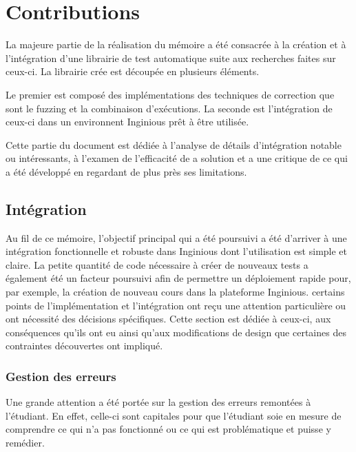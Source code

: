 \documentclass[a4paper]{report}
\begin{document}
\chapter{Contributions}
La majeure partie de la réalisation du mémoire a été consacrée à la création et à l'intégration d'une librairie de test automatique suite aux recherches faites sur ceux-ci.
La librairie crée est découpée en plusieurs éléments.

Le premier est composé des implémentations des techniques de correction que sont le fuzzing et la combinaison d'exécutions.
La seconde est l'intégration de ceux-ci dans un environnent Inginious prêt à être utilisée.

Cette partie du document est dédiée à l'analyse de détails d'intégration notable ou intéressants, à l'examen de l'efficacité de a solution et a une critique de ce qui a été développé en regardant de plus près ses limitations.



\section{Intégration}
Au fil de ce mémoire, l'objectif principal qui a été poursuivi a été d'arriver à une intégration fonctionnelle et robuste dans Inginious dont l'utilisation est simple et claire.
La petite quantité de code nécessaire à créer  de nouveaux tests a également été un facteur poursuivi afin de permettre un déploiement rapide pour, par exemple, la création de nouveau cours dans la plateforme Inginious.
certains points de l'implémentation et l'intégration ont reçu une attention particulière ou ont nécessité des décisions spécifiques.
Cette section est dédiée à ceux-ci, aux conséquences qu'ils ont eu ainsi qu'aux modifications de design que certaines des contraintes découvertes ont impliqué.

\subsection{Gestion des erreurs}
Une grande attention a été portée sur la gestion des erreurs remontées à l'étudiant.
En effet, celle-ci sont capitales pour que l'étudiant soie en mesure de comprendre ce qui n'a pas fonctionné ou ce qui est problématique et puisse y remédier.
\end{document}
